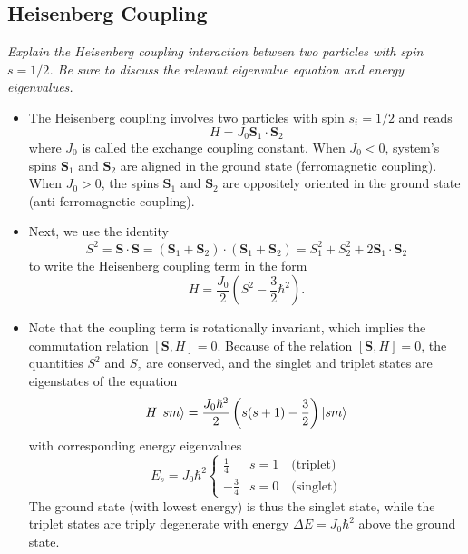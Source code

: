 \documentclass[11pt, a4paper]{article}
\renewcommand{\vec}[1]{\bm{#1}}  %
\renewcommand{\S}{\vec{S}}  %
\begin{document}
\subsection{Heisenberg Coupling}
\textit{Explain the Heisenberg coupling interaction between two particles with spin $ s = 1/2 $. Be sure to discuss the relevant eigenvalue equation and energy eigenvalues.}

\begin{itemize}
    \item The Heisenberg coupling involves two particles with spin $ s_{i} = 1/2 $ and reads
    \begin{equation*}
        H = J_{0} \S_{1} \cdot \S_{2}
    \end{equation*}
    where $ J_{0} $ is called the exchange coupling constant. When $ J_{0} < 0 $, system's spins $ \S_{1} $ and $ \S_{2} $ are aligned in the ground state (ferromagnetic coupling). When $ J_{0} > 0 $, the spins $ \S_{1} $ and $ \S_{2} $ are oppositely oriented in the ground state (anti-ferromagnetic coupling). 

    \item Next, we use the identity
    \begin{equation*}
        S^{2} = \S \cdot \S = (\S_{1} + \S_{2}) \cdot (\S_{1} + \S_{2}) = S_{1}^{2} + S_{2}^{2} + 2 \S_{1} \cdot \S_{2}
    \end{equation*}
    to write the Heisenberg coupling term in the form
    \begin{equation*}
        H = \frac{J_{0}}{2}\left( S^{2} - \frac{3}{2} \hbar^{2} \right).
    \end{equation*}
    
    \item Note that the coupling term is rotationally invariant, which implies the commutation relation $ [\S, H] = 0 $. Because of the relation $ [\S, H] = 0 $, the quantities $ S^{2} $ and $ S_{z} $ are conserved, and the singlet and triplet states are eigenstates of the equation
    \begin{equation*}
        H \ket{sm} = \frac{J_{0}\hbar^{2}}{2} \left( s(s + 1) - \frac{3}{2} \right)\ket{sm}
    \end{equation*}
    with corresponding energy eigenvalues
    \begin{equation*}
        E_{s} = J_{0}\hbar^{2} 
        \begin{cases}
            \frac{1}{4} & s = 1 \quad \text{(triplet)}\\
            -\frac{3}{4} & s = 0 \quad \text{(singlet)}
        \end{cases}
    \end{equation*}
    The ground state (with lowest energy) is thus the singlet state, while the triplet states are triply degenerate with energy $ \Delta E = J_{0}\hbar^{2} $ above the ground state.

\end{itemize}
\end{document}
